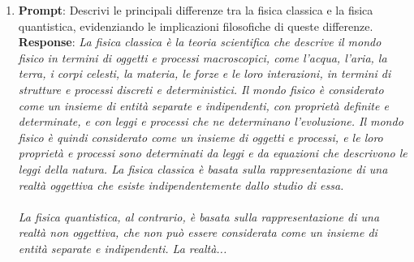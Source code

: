 \documentclass{article}
\begin{document}
\begin{enumerate}
		\item 
		\textbf{Prompt}: Descrivi le principali differenze tra la fisica classica e la fisica quantistica, evidenziando le implicazioni filosofiche di queste differenze.\\
		\textbf{Response}: \textit{La fisica classica è la teoria scientifica che descrive il mondo fisico in termini di oggetti e processi macroscopici, come l'acqua, l'aria, la terra, i corpi celesti, la materia, le forze e le loro interazioni, in termini di strutture e processi discreti e deterministici. Il mondo fisico è considerato come un insieme di entità separate e indipendenti, con proprietà definite e determinate, e con leggi e processi che ne determinano l'evoluzione. Il mondo fisico è quindi considerato come un insieme di oggetti e processi, e le loro proprietà e processi sono determinati da leggi e da equazioni che descrivono le leggi della natura. La fisica classica è basata sulla rappresentazione di una realtà oggettiva che esiste indipendentemente dallo studio di essa.\\\\La fisica quantistica, al contrario, è basata sulla rappresentazione di una realtà non oggettiva, che non può essere considerata come un insieme di entità separate e indipendenti. La realtà...}
	
	\end{enumerate}
	 
\end{document}
